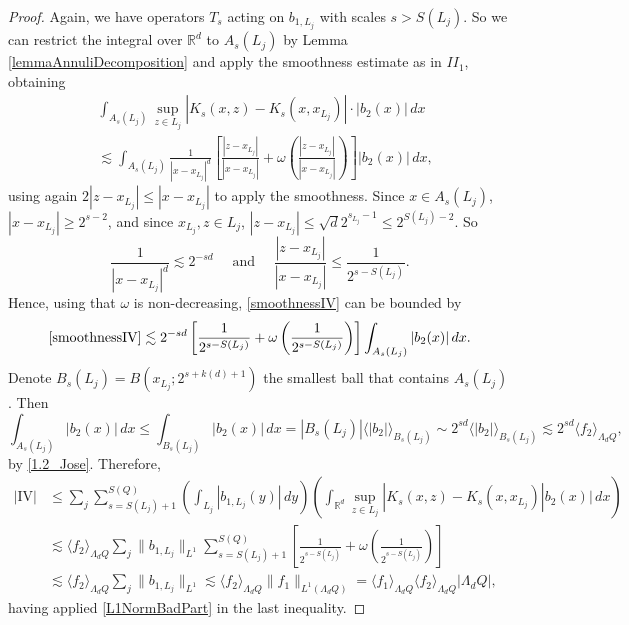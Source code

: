 \documentclass[12pt]{amsart}
\newcommand{\R}{\mathbb{R}}
\theoremstyle{plain}
\theoremstyle{definition} %
\numberwithin{equation}{section}
\begin{document}
\begin{proof}
    Again, we have operators $T_s$ acting on $b_{1,L_j}$ with scales $s>S(L_j)$. So we can restrict the integral over $\R^d$ to $A_s(L_j)$ by Lemma \ref{lemmaAnnuliDecomposition} and apply the smoothness estimate as in $II_1$, obtaining
    \begin{align}\label{smoothnessIV}
    \nonumber&\int_{A_s(L_j)}\sup_{z\in L_j}|K_s(x,z)-K_s(x,x_{L_j})|\cdot |b_2(x)|\, dx
    \\&\lesssim 
    \int_{A_s(L_j)}\frac{1}{|x-x_{L_j}|^d}\left[\frac{|z-x_{L_j}|}{|x-x_{L_j}|}+\omega\left(\frac{|z-x_{L_j}|}{|x-x_{L_j}|}\right)\right]|b_2(x)|\, dx,   
    \end{align}
    using again $2|z-x_{L_j}|\leq |x-x_{L_j}|$ to apply the smoothness. 
    Since $x\in A_s(L_j)$, $|x-x_{L_j}|\geq 2^{s-2}$, and since $x_{L_j},z\in L_j$, $|z-x_{L_j}|\leq \sqrt{d}2^{s_{L_j}-1}\leq 2^{S(L_j)-2}$. So 
    \[
    \frac{1}{|x-x_{L_j}|^d}
    \lesssim 
    2^{-sd}
    \quad \text{ and } \quad
    \frac{|z-x_{L_j}|}{|x-x_{L_j}|}
    \leq 
    \frac{1}{2^{s-S(L_j)}}.
    \]
    Hence, using that $\omega$ is non-decreasing, \eqref{smoothnessIV} can be bounded by
    \[
    \eqref{smoothnessIV}
    \lesssim
    2^{-sd}\left[\frac{1}{2^{s-S(L_j)}}+\omega\left(\frac{1}{2^{s-S(L_j)}}\right)\right]
    \int_{A_s(L_j)}|b_2(x)|\, dx.
    \]
Denote $B_s(L_j)=B(x_{L_j};2^{s+k(d)+1})$ the smallest ball that contains $A_s(L_j)$. Then
    \[
    \int_{A_s(L_j)}|b_2(x)|\, dx
    \leq 
    \int_{B_s(L_j)}|b_2(x)|\, dx
    =
    |B_s(L_j)|\langle |b_2|\rangle_{B_s(L_j)}
    \sim 
    2^{sd}\langle |b_2|\rangle_{B_s(L_j)} \lesssim 2^{sd}\langle f_2\rangle_{\Lambda_d Q},
    \]
    by \eqref{1.2_Jose}. Therefore, 
    \begin{align*}
        |\mathrm{IV}|
        &\leq 
        \sum_{j}
        \sum_{s=S(L_j)+1}^{S(Q)}
        \left(\int_{L_j}|b_{1,L_j}(y)|\, dy\right)\left(\int_{\R^d} \sup_{z\in L_j}|K_s(x,z)-K_s(x,x_{L_j})|b_2(x)|\, dx\right)
        \\&\lesssim 
        \langle f_2\rangle_{\Lambda_d Q}\sum_{j}\|b_{1,L_j}\|_{L^1}\sum_{s=S(L_j)+1}^{S(Q)}\left[\frac{1}{2^{s-S(L_j)}}+\omega\left(\frac{1}{2^{s-S(L_j)}}\right)\right]
        \\&\lesssim 
        \langle f_2\rangle_{\Lambda_d Q}\sum_{j}\|b_{1,L_j}\|_{L^1}
        \lesssim 
        \langle f_2\rangle_{\Lambda_d Q}\|f_1\|_{L^1(\Lambda_d Q)}
        =
        \langle f_1\rangle_{\Lambda_d Q}\langle f_2\rangle_{\Lambda_d Q}|\Lambda_d Q|,
    \end{align*}
    having applied \eqref{L1NormBadPart} in the last inequality.\qedhere
\end{proof}
 
\end{document}
